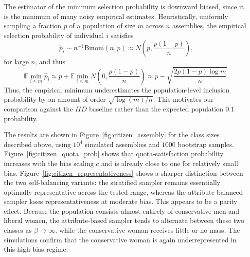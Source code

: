 \begin{subappendices}
The estimator of the minimum selection probability is downward biased, since 
it is the minimum of many noisy empirical estimates. Heuristically, uniformly sampling a fraction 
$p$ of a population of size $m$ across $n$ assemblies, the empirical selection probability of
 individual $i$ satisfies
\[
    \hat p_i \sim n^{-1}\mathrm{Binom}(n,p) \approx N\left(p, \frac{p(1-p)}{n}\right),
\]
 for large $n$, and thus
\[
    \mathbb{E}\min_{i \leq m} \hat p_i
    \approx
    p + \mathbb{E}\min_{i \leq m}
    N\left(0, \frac{p(1-p)}{n}\right)
    \approx
    p - \sqrt{\frac{2p(1-p)\log m}{n}}.
\]
Thus, the empirical minimum underestimates the population-level 
inclusion probability by an amount of order $\sqrt{\log(m) / n}$. 
This motivates our comparison against the $IID$ baseline rather than the expected
population $0.1$ probability.

The results are shown in Figure~\ref{fig:citizen_assembly} for the class sizes
 described above, using $10^4$ simulated assemblies and $1000$ bootstrap samples. 
 Figure~\ref{fig:citizen_quota_prob} shows that quota-satisfaction probability 
 increases with the bias scaling $c$ and is already close to one for relatively 
 small bias. Figure~\ref{fig:citizen_representativeness} shows a sharper distinction
  between the two self-balancing variants: the stratified sampler remains essentially 
  optimally representative across the tested range, whereas the attribute-balanced 
  sampler loses representativeness at moderate bias. This appears to be a parity effect.
   Because the population consists almost entirely of conservative men and liberal women, 
   the attribute-based sampler tends to alternate between these two classes as $\beta \to \infty$,
    while the conservative woman receives little or no mass. The simulations confirm that the 
    conservative woman is again underrepresented in this high-bias regime.



\begin{figure}[t]
    \centering


\end{figure}
\end{subappendices}

